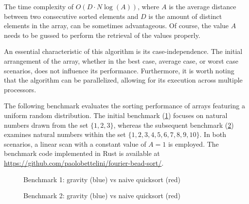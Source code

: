 \documentclass{article}
\begin{document}
The time complexity of \(O(D \cdot N \log(A))\), where \(A\)
is the average distance between two consecutive sorted
elements and \(D\) is the amount of distinct elements in the array,
can be sometimes advantageous.
Of course, the value \(A\) needs to be gussed to perform the retrieval of the values properly.

An essential characteristic of this algorithm is its case-independence. The initial arrangement of the array, whether in the best case, average case, or worst case scenarios, does not influence its performance.
Furthermore, it is worth noting that the algorithm can be parallelized,
allowing for its execution across multiple processors.

\pagebreak

The following benchmark evaluates the sorting performance of arrays featuring a uniform random distribution.
The initial benchmark (\ref{fig:bench1}) focuses on natural numbers drawn from the set \(\{1, 2, 3\}\),
whereas the subsequent benchmark (\ref{fig:bench2}) examines natural numbers within the set \(\{1, 2, 3, 4, 5, 6, 7, 8, 9, 10\}\).
In both scenarios, a linear scan with a constant value of \(A=1\) is employed.
The benchmark code implemented in Rust is available at \url{https://github.com/paolobettelini/fourier-bead-sort/}.

\begin{figure}[ht]
\centering
{}
\caption{Benchmark 1: gravity (blue) vs naive quicksort (red)}
\label{fig:bench1}
\end{figure}

\begin{figure}[ht]
\centering
{}
\caption{Benchmark 2: gravity (blue) vs naive quicksort (red)}
\label{fig:bench2}
\end{figure}

\pagebreak

\nocite{*} %

\printbibliography
\listoffigures
\end{document}
